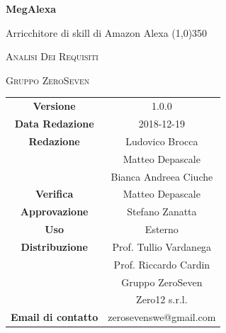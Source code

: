 \documentclass[a4paper,12pt]{book}
\author{Ludovico Brocca}
\date{2018-12-19}
\begin{document}
\begin{titlepage}
	\centering
	{\huge\bfseries MegAlexa \par}
	Arricchitore di skill di Amazon Alexa
	\line(1,0){350} \\
	{\scshape\LARGE Analisi Dei Requisiti \par}
	\vspace{1cm}
	{\scshape Gruppo ZeroSeven \par}
	\logo
	\begin{tabular}{c|c}
		{\hfill \textbf{Versione}} 			& 1.0.0				\\
		{\hfill\textbf{Data Redazione}} 	& 2018-12-19		\\ 
		{\hfill\textbf{Redazione}} 			&  		Ludovico Brocca \\ & Matteo Depascale \\&Bianca Andreea Ciuche\\	
		{\hfill\textbf{Verifica}} 				&  	Matteo Depascale			\\ 
		{\hfill\textbf{Approvazione}} 		&  		Stefano Zanatta			\\ 
		{\hfill\textbf{Uso}} 					& 		Esterno		\\ 
		{\hfill\textbf{Distribuzione}} 			& 			Prof. Tullio Vardanega \\ & Prof. Riccardo Cardin \\ & Gruppo ZeroSeven	\\ & Zero12 s.r.l. \\
		{\hfill\textbf{Email di contatto}} & zerosevenswe@gmail.com \\
	\end{tabular}
\end{titlepage}
	

	
	\label{LastFrontPage}
	\newpage	
	
	\pagestyle{mymain}
	\tableofcontents
	\listoffigures
	\listoftables
	
	
	
	
	
	\label{LastPage}
\end{document}
